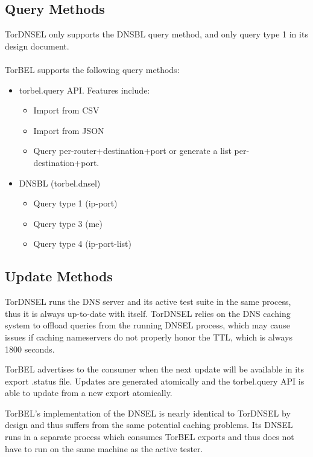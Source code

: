 \documentclass{article}
\begin{document}
\subsection{Query Methods}
TorDNSEL only supports the DNSBL query method, and only query type 1 in its
design document.
\\
\\
TorBEL supports the following query methods:
\begin{itemize}
\item torbel.query API. Features include:
  \begin{itemize}
  \item Import from CSV
  \item Import from JSON
  \item Query per-router+destination+port or generate a list per-destination+port.
  \end{itemize}
\item DNSBL (torbel.dnsel)
  \begin{itemize}
  \item Query type 1 (ip-port)
  \item Query type 3 (me)
  \item Query type 4 (ip-port-list)
  \end{itemize}
\end{itemize}

\subsection{Update Methods}
TorDNSEL runs the DNS server and its active test suite in the same
process, thus it is always up-to-date with itself.  TorDNSEL relies on
the DNS caching system to offload queries from the running DNSEL
process, which may cause issues if caching nameservers do not properly
honor the TTL, which is always 1800 seconds.

TorBEL advertises to the consumer when the next update will be
available in its export .status file.  Updates are generated
atomically and the torbel.query API is able to update from a new
export atomically.

TorBEL's implementation of the DNSEL is nearly identical to TorDNSEL
by design and thus suffers from the same potential caching problems.
Its DNSEL runs in a separate process which consumes TorBEL exports
and thus does not have to run on the same machine as the active
tester.
\end{document}

